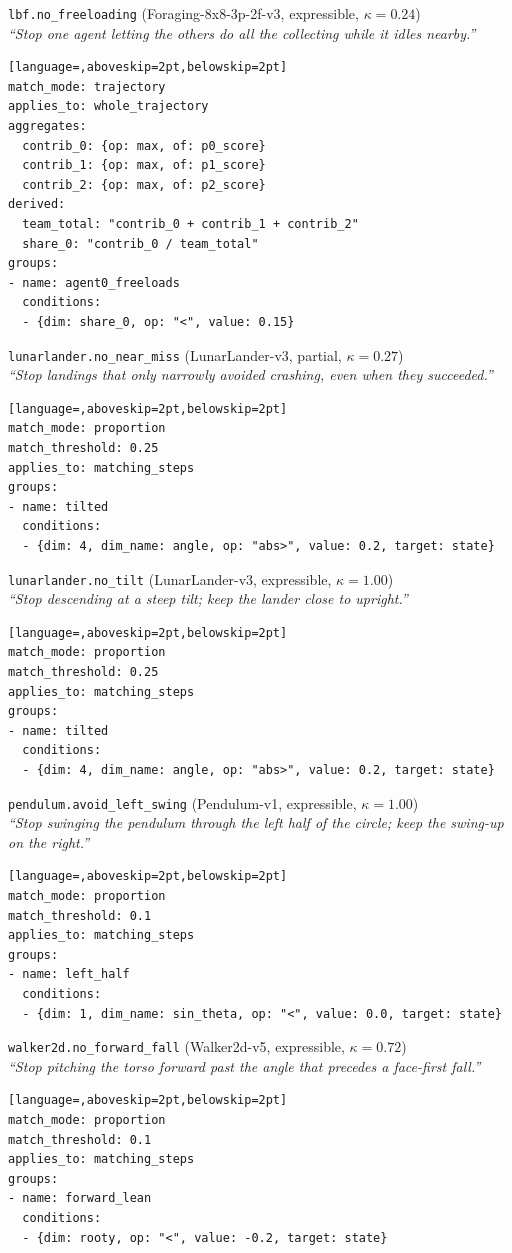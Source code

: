 \par\medskip\noindent\texttt{lbf.no\_freeloading} (Foraging-8x8-3p-2f-v3, expressible, $\kappa=0.24$)\\
\textit{``Stop one agent letting the others do all the collecting while it idles nearby.''}\nopagebreak
\begin{lstlisting}[language=,aboveskip=2pt,belowskip=2pt]
match_mode: trajectory
applies_to: whole_trajectory
aggregates:
  contrib_0: {op: max, of: p0_score}
  contrib_1: {op: max, of: p1_score}
  contrib_2: {op: max, of: p2_score}
derived:
  team_total: "contrib_0 + contrib_1 + contrib_2"
  share_0: "contrib_0 / team_total"
groups:
- name: agent0_freeloads
  conditions:
  - {dim: share_0, op: "<", value: 0.15}
\end{lstlisting}
\par\medskip\noindent\texttt{lunarlander.no\_near\_miss} (LunarLander-v3, partial, $\kappa=0.27$)\\
\textit{``Stop landings that only narrowly avoided crashing, even when they succeeded.''}\nopagebreak
\begin{lstlisting}[language=,aboveskip=2pt,belowskip=2pt]
match_mode: proportion
match_threshold: 0.25
applies_to: matching_steps
groups:
- name: tilted
  conditions:
  - {dim: 4, dim_name: angle, op: "abs>", value: 0.2, target: state}
\end{lstlisting}
\par\medskip\noindent\texttt{lunarlander.no\_tilt} (LunarLander-v3, expressible, $\kappa=1.00$)\\
\textit{``Stop descending at a steep tilt; keep the lander close to upright.''}\nopagebreak
\begin{lstlisting}[language=,aboveskip=2pt,belowskip=2pt]
match_mode: proportion
match_threshold: 0.25
applies_to: matching_steps
groups:
- name: tilted
  conditions:
  - {dim: 4, dim_name: angle, op: "abs>", value: 0.2, target: state}
\end{lstlisting}
\par\medskip\noindent\texttt{pendulum.avoid\_left\_swing} (Pendulum-v1, expressible, $\kappa=1.00$)\\
\textit{``Stop swinging the pendulum through the left half of the circle; keep the swing-up on the right.''}\nopagebreak
\begin{lstlisting}[language=,aboveskip=2pt,belowskip=2pt]
match_mode: proportion
match_threshold: 0.1
applies_to: matching_steps
groups:
- name: left_half
  conditions:
  - {dim: 1, dim_name: sin_theta, op: "<", value: 0.0, target: state}
\end{lstlisting}
\par\medskip\noindent\texttt{walker2d.no\_forward\_fall} (Walker2d-v5, expressible, $\kappa=0.72$)\\
\textit{``Stop pitching the torso forward past the angle that precedes a face-first fall.''}\nopagebreak
\begin{lstlisting}[language=,aboveskip=2pt,belowskip=2pt]
match_mode: proportion
match_threshold: 0.1
applies_to: matching_steps
groups:
- name: forward_lean
  conditions:
  - {dim: rooty, op: "<", value: -0.2, target: state}
\end{lstlisting}

